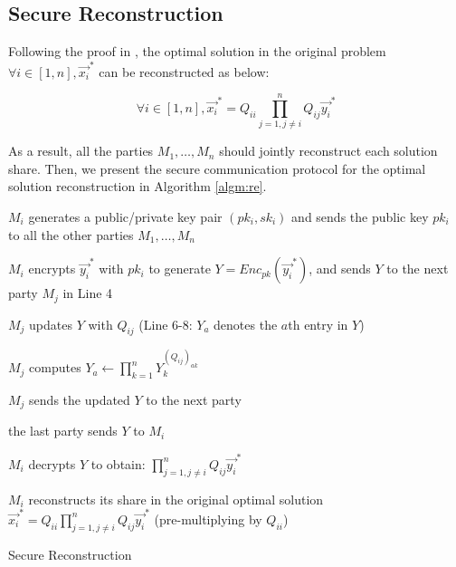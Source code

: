 \subsection{Secure Reconstruction}

Following the proof in \cite{HongIJER15,HongJCS12}, the optimal solution in the original problem $\forall i\in[1,n], \vec{x_i}^*$ can be reconstructed as below:

\begin{equation}
\forall i\in[1,n], \vec{x_i}^*=Q_{ii}\prod_{j=1,j\ne i}^nQ_{ij}\vec{y_i}^*
\end{equation}

As a result, all the parties $M_1,\dots, M_n$ should jointly reconstruct each solution share. Then, we present the secure communication protocol for the optimal solution reconstruction in Algorithm \ref{algm:re}.

\begin{algorithm}[!h]
	\small
	\begin{algorithmic}[1]
		\renewcommand{\algorithmicrequire}{\textbf{Input:}}
		\renewcommand{\algorithmicensure}{\textbf{Output:}}
		
		\STATE $M_i$ generates a public/private key pair $(pk_i, sk_i)$ and sends the public key $pk_i$ to all the other parties $M_1,\dots, M_n$ 
		
		\STATE $M_i$ encrypts $\vec{y_i}^*$ with $pk_i$ to generate $Y=Enc_{pk}(\vec{y_i}^*)$, and sends $Y$ to the next party $M_j$ in Line 4
		
		
		
	\STATE $M_j$ updates $Y$ with $Q_{ij}$ (Line 6-8: $Y_a$ denotes the $a$th entry in $Y$)
	
	\STATE $M_j$ computes $Y_a \leftarrow \prod^{n}_{k=1} Y_k^{(Q_{ij})_{ak}}$
	\ENDFOR
		
		\STATE $M_j$ sends the updated $Y$ to the next party
		
		\ENDFOR
		
		\STATE the last party sends $Y$ to $M_i$
		
		\STATE $M_i$ decrypts $Y$ to obtain: $\prod_{j=1,j\ne i}^nQ_{ij}\vec{y_i}^*$
		
		\STATE $M_i$ reconstructs its share in the original optimal solution $\vec{x_i}^*=Q_{ii}\prod_{j=1,j\ne i}^nQ_{ij}\vec{y_i}^*$ (pre-multiplying by $Q_{ii}$)
		
		\ENDFOR
		
	\end{algorithmic}
	\caption{Secure Reconstruction}\label{algm:re}
\end{algorithm}

